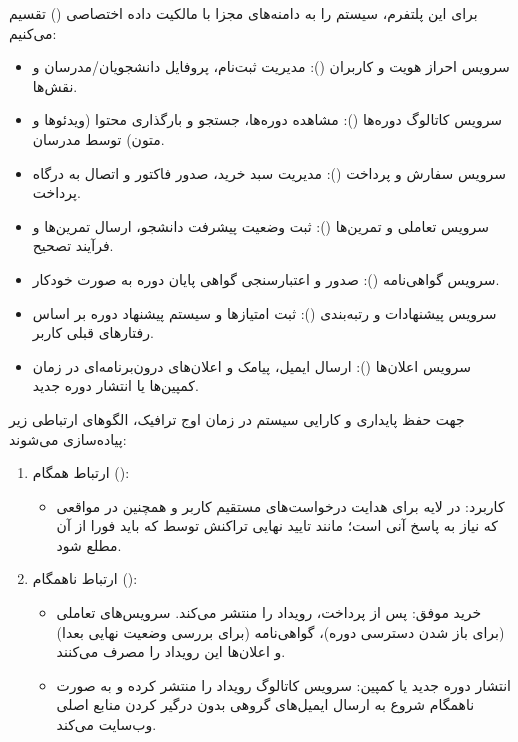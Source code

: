 برای این پلتفرم، سیستم را به دامنه‌های مجزا با مالکیت داده اختصاصی () تقسیم می‌کنیم:
\begin{itemize}
    \item {سرویس احراز هویت و کاربران ():} مدیریت ثبت‌نام، پروفایل دانشجویان/مدرسان و نقش‌ها.
    \item {سرویس کاتالوگ دوره‌ها ():} مشاهده دوره‌ها، جستجو و بارگذاری محتوا (ویدئوها و متون) توسط مدرسان.
    \item {سرویس سفارش و پرداخت ():} مدیریت سبد خرید، صدور فاکتور و اتصال به درگاه پرداخت.
    \item {سرویس تعاملی و تمرین‌ها ():} ثبت وضعیت پیشرفت دانشجو، ارسال تمرین‌ها و فرآیند تصحیح.
    \item {سرویس گواهی‌نامه ():} صدور و اعتبارسنجی گواهی پایان دوره به صورت خودکار.
    \item {سرویس پیشنهادات و رتبه‌بندی ():} ثبت امتیازها و سیستم پیشنهاد دوره بر اساس رفتارهای قبلی کاربر.
    \item {سرویس اعلان‌ها ():} ارسال ایمیل، پیامک و اعلان‌های درون‌برنامه‌ای در زمان کمپین‌ها یا انتشار دوره جدید.
\end{itemize}

جهت حفظ پایداری و کارایی سیستم در زمان اوج ترافیک، الگوهای ارتباطی زیر پیاده‌سازی می‌شوند:
\begin{enumerate}
    \item {ارتباط همگام ():}
    \begin{itemize}
        \item {کاربرد:} در لایه  برای هدایت درخواست‌های مستقیم کاربر و همچنین در مواقعی که نیاز به پاسخ آنی است؛ مانند تایید نهایی تراکنش توسط  که  باید فورا از آن مطلع شود.
    \end{itemize}
    \item {ارتباط ناهمگام ():}
    \begin{itemize}
        \item {خرید موفق:} پس از پرداخت،  رویداد  را منتشر می‌کند. سرویس‌های تعاملی (برای باز شدن دسترسی دوره)، گواهی‌نامه (برای بررسی وضعیت نهایی بعدا) و اعلان‌ها این رویداد را مصرف می‌کنند.
        \item {انتشار دوره جدید یا کمپین:} سرویس کاتالوگ رویداد  را منتشر کرده و  به صورت ناهمگام شروع به ارسال ایمیل‌های گروهی بدون درگیر کردن منابع اصلی وب‌سایت می‌کند.
    \end{itemize}
\end{enumerate}

